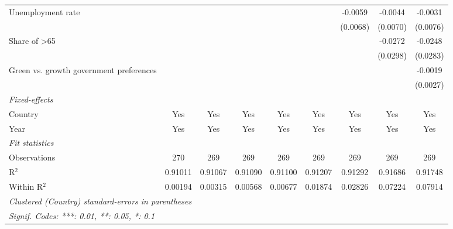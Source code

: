 \begin{table}[htbp]
\begin{tabular}{lcccccccc}
      Unemployment rate                                        &          &          &                       &          &          & -0.0059  & -0.0044  & -0.0031\\   
                                                               &          &          &                       &          &          & (0.0068) & (0.0070) & (0.0076)\\   
      Share of >65                                             &          &          &                       &          &          &          & -0.0272  & -0.0248\\   
                                                               &          &          &                       &          &          &          & (0.0298) & (0.0283)\\   
      Green vs. growth government preferences                  &          &          &                       &          &          &          &          & -0.0019\\   
                                                               &          &          &                       &          &          &          &          & (0.0027)\\   
      \midrule
      \emph{Fixed-effects}\\
      Country                                                  & Yes      & Yes      & Yes                   & Yes      & Yes      & Yes      & Yes      & Yes\\  
      Year                                                     & Yes      & Yes      & Yes                   & Yes      & Yes      & Yes      & Yes      & Yes\\  
      \midrule
      \emph{Fit statistics}\\
      Observations                                             & 270      & 269      & 269                   & 269      & 269      & 269      & 269      & 269\\  
      R$^2$                                                    & 0.91011  & 0.91067  & 0.91090               & 0.91100  & 0.91207  & 0.91292  & 0.91686  & 0.91748\\  
      Within R$^2$                                             & 0.00194  & 0.00315  & 0.00568               & 0.00677  & 0.01874  & 0.02826  & 0.07224  & 0.07914\\  
      \midrule \midrule
      \multicolumn{9}{l}{\emph{Clustered (Country) standard-errors in parentheses}}\\
      \multicolumn{9}{l}{\emph{Signif. Codes: ***: 0.01, **: 0.05, *: 0.1}}\\
   \end{tabular}
\end{table}


